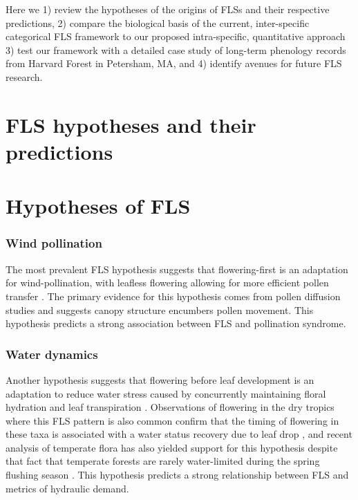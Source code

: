 \documentclass{article}
\begin{document}
\noindent Here we 1) review the hypotheses of the origins of FLSs and their respective predictions, 2) compare the biological basis of the current, inter-specific categorical FLS framework to our proposed intra-specific, quantitative approach 3) test our framework with a detailed case study of long-term phenology records from Harvard Forest in Petersham, MA, and 4) identify avenues for future FLS research.
\section*{FLS hypotheses and their predictions}
\section*{Hypotheses of FLS}
\subsubsection*{ Wind pollination}
\noindent The most prevalent FLS hypothesis suggests that flowering-first is an adaptation for wind-pollination, with leafless flowering allowing for more efficient pollen transfer \citep{Whitehead1969,Friedman2009}. The primary evidence for this hypothesis comes from pollen diffusion studies \citep[e.g., particle movement through closed and open canopies,][]{Niklas1985,Nathan2005, Milleron2012} and suggests canopy structure encumbers pollen movement. This hypothesis predicts a strong association between FLS and pollination syndrome.
\subsubsection*{Water dynamics}
\noindent Another hypothesis suggests that flowering before leaf development is an adaptation to reduce water stress caused by concurrently maintaining floral hydration and leaf transpiration \citep{Franklin2016}. Observations of flowering in the dry tropics where this FLS pattern is also common confirm that the timing of flowering in these taxa is associated with a water status recovery due to leaf drop \citep{Borchert1983,Reich1984}, and recent analysis of temperate flora has also yielded support for this hypothesis despite that fact that temperate forests are rarely water-limited during the spring flushing season \citep{Gougherty2018}. This hypothesis predicts a strong relationship between FLS and metrics of hydraulic demand.
 
\end{document}
